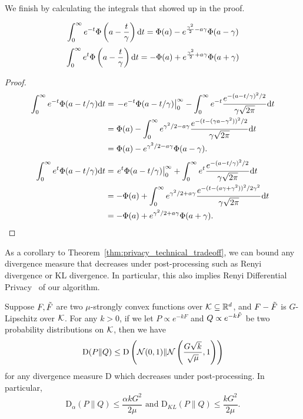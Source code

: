 We finish by calculating the integrals that showed up in the proof.
\begin{claim}
\label{claim:some_gaussian_integrals}
$$\int_0^\infty e^{-t} \Phi\left( a-\frac{t}{\gamma}\right) \mathrm{d} t = \Phi(a)-e^{\frac{\gamma^2}{2}-a\gamma}\Phi(a-\gamma)$$
$$\int_0^\infty e^{t} \Phi\left( a-\frac{t}{\gamma}\right)  \mathrm{d} t = -\Phi(a)+e^{\frac{\gamma^2}{2}+a\gamma}\Phi(a+\gamma)$$
\end{claim}
\begin{proof}
\begin{align*}
    \int_0^\infty e^{-t} \Phi(a-t/\gamma) \mathrm{d} t &= \left.-e^{-t}\Phi(a-t/\gamma)\right\vert_0^\infty - \int_0^\infty e^{-t} \frac{e^{-(a-t/\gamma)^2/2}}{\gamma\sqrt{2\pi}} \mathrm{d} t\\
     &= \Phi(a) - \int_0^\infty e^{\gamma^2/2-a\gamma} \frac{e^{-(t-(\gamma a-\gamma^2))^2/2}}{\gamma\sqrt{2\pi}} \mathrm{d} t\\
     &= \Phi(a) -  e^{\gamma^2/2-a\gamma} \Phi(a-\gamma).
\end{align*}
\begin{align*}
    \int_0^\infty e^{t} \Phi(a-t/\gamma) \mathrm{d} t &= \left.e^{t}\Phi(a-t/\gamma)\right\vert_0^\infty + \int_0^\infty e^{t} \frac{e^{-(a-t/\gamma)^2/2}}{\gamma\sqrt{2\pi}} \mathrm{d} t\\
     &= -\Phi(a) + \int_0^\infty e^{\gamma^2/2+a\gamma} \frac{e^{-(t-(a\gamma+\gamma^2))^2/2\gamma^2}}{\gamma\sqrt{2\pi}} \mathrm{d} t\\
     &= -\Phi(a)  +  e^{\gamma^2/2+a\gamma} \Phi(a+\gamma).
\end{align*}
\end{proof}

As a corollary to Theorem~\ref{thm:privacy_technical_tradeoff}, we can bound any divergence measure that decreases under post-processing such as Renyi divergence or KL divergence. In particular, this also implies Renyi Differential Privacy~\cite{Mir17} of our algorithm.


\begin{corollary}
\label{cor:divergence_privacy}
Suppose $F,{\Tilde{F}}$ are two $\mu$-strongly convex functions over $\mathcal K\subseteq \mathbb{R}^d$, and $F-{\Tilde{F}}$ is $G$-Lipschitz over $\mathcal K$.
For any $k>0$, if we let $P\propto e^{-kF}$ and $Q\propto e^{-k{\Tilde{F}}}$ be two probability distributions on $\mathcal K$, then we have
\begin{align*}
    \mathrm{D}(P\|Q)\leq \mathrm{D}\left(\mathcal N(0,1)\|\mathcal N\left( \frac{G\sqrt{k}}{\sqrt{\mu}},1\right)\right)
\end{align*}
for any divergence measure $\mathrm{D}$ which decreases under post-processing. In particular, $$\mathrm{D}_{\alpha}(P\|Q)\le \frac{\alpha k G^2}{2\mu} \text{ and }\mathrm{D}_{KL}(P\|Q)\le \frac{kG^2}{2\mu}.$$
\end{corollary}

